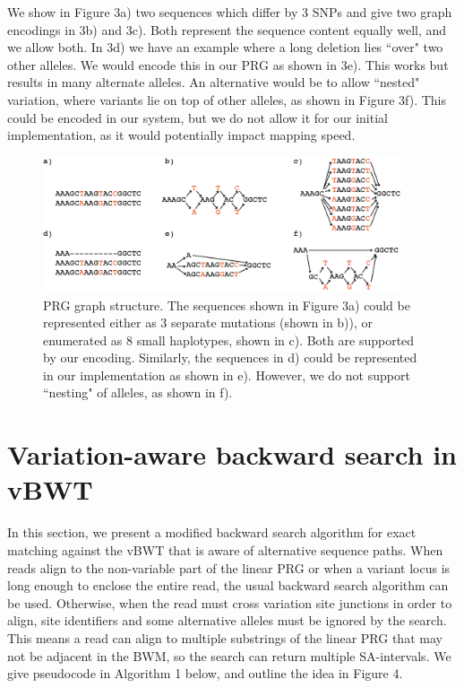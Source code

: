 \documentclass[runningheads,a4paper]{llncs}
\begin{document}
We show in Figure 3a) two sequences which differ by 3 SNPs and give two graph encodings in 3b) and 3c). Both represent the sequence content equally well, and we allow both.
In 3d) we have an example where a long deletion lies ``over" two other alleles. We would encode this in our PRG as shown in 3e). This works but results in many alternate alleles. An alternative would be to allow ``nested" variation, where variants lie on top of other alleles, as shown in Figure 3f). This could be encoded in our system, but we do not allow it for our initial implementation, as it would potentially impact mapping speed. 

\begin{figure}
\centering
\includegraphics[height=4cm]{graph_construction.png}
\caption{PRG graph structure. The sequences shown in Figure 3a) could be represented either as 3 separate mutations (shown in b)), or enumerated as 8 small haplotypes, shown in c). Both are supported by our encoding. Similarly, the sequences in d) could be represented in our implementation as shown in e). However, we do not support ``nesting" of alleles, as shown in f).}
\label{lab2}
\end{figure}






\section{Variation-aware backward search in vBWT}

In this section, we present a modified backward search algorithm for exact matching against the vBWT that is aware of alternative sequence paths. When reads align to the non-variable part of the linear PRG or when a variant locus is long enough to enclose the entire read, the usual backward search algorithm can be used. Otherwise, when the read must cross variation site junctions in order to align, site identifiers and some alternative alleles must be ignored by the search. This means a read can align to multiple substrings of the linear PRG that may not be adjacent in the BWM, so the search can return multiple SA-intervals. We give pseudocode in Algorithm 1 below, and outline the idea in Figure 4.
\end{document}
